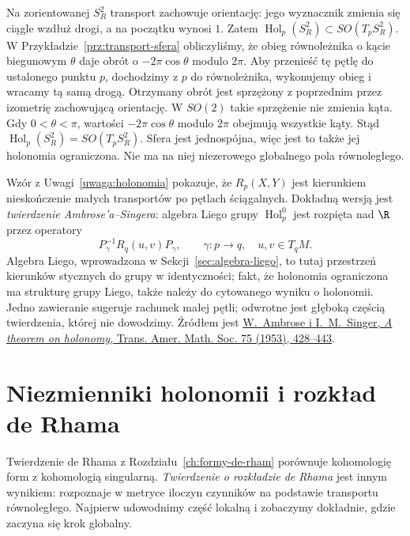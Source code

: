 \begin{przyklad}
\label{prz:holonomia-sfera}
Na zorientowanej $S_R^2$ transport zachowuje orientację:
jego wyznacznik zmienia się ciągle wzdłuż drogi,
a na początku wynosi $1$. Zatem
$\operatorname{Hol}_p(S_R^2)\subset SO(T_pS_R^2)$.
W Przykładzie~\ref{prz:transport-sfera} obliczyliśmy,
że obieg równoleżnika o kącie biegunowym $\theta$ daje obrót
o $-2\pi\cos\theta$ modulo $2\pi$. Aby przenieść tę
pętlę do ustalonego punktu $p$, dochodzimy z $p$ do
równoleżnika, wykonujemy obieg i wracamy tą samą drogą.
Otrzymany obrót jest sprzężony z poprzednim przez
izometrię zachowującą orientację. W $SO(2)$ takie
sprzężenie nie zmienia kąta. Gdy $0<\theta<\pi$,
wartości $-2\pi\cos\theta$ modulo $2\pi$ obejmują
wszystkie kąty. Stąd
$\operatorname{Hol}_p(S_R^2)=SO(T_pS_R^2)$.
Sfera jest jednospójna, więc jest to także jej
holonomia ograniczona. Nie ma na niej niezerowego
globalnego pola równoległego.
\end{przyklad}

\begin{uwaga}
\label{uwaga:ambrose-singer-holonomia}
Wzór z Uwagi~\ref{uwaga:holonomia} pokazuje, że
$R_p(X,Y)$ jest kierunkiem nieskończenie małych
transportów po pętlach ściągalnych. Dokładną wersją
jest \emph{twierdzenie Ambrose'a--Singera}:
algebra Liego grupy $\operatorname{Hol}^0_p$ jest
rozpięta nad $\R$ przez operatory
\[
 P_\gamma^{-1}R_q(u,v)P_\gamma,
 \qquad \gamma:p\longrightarrow q,\quad
 u,v\in T_qM.
\]
Algebra Liego, wprowadzona w Sekcji~\ref{sec:algebra-liego},
to tutaj przestrzeń kierunków stycznych do grupy
w identyczności; fakt, że holonomia ograniczona ma
strukturę grupy Liego, także należy do cytowanego
wyniku o holonomii. Jedno zawieranie sugeruje rachunek małej
pętli; odwrotne jest głęboką częścią twierdzenia, której
nie dowodzimy. Źródłem jest
\href{https://doi.org/10.1090/S0002-9947-1953-0063739-1}
{W.~Ambrose i I.~M.~Singer, \emph{A theorem on holonomy},
Trans. Amer. Math. Soc. 75 (1953), 428--443}.
\end{uwaga}

\section{Niezmienniki holonomii i rozkład de Rhama}
\label{sec:rozklad-de-rhama}

Twierdzenie de Rhama z Rozdziału~\ref{ch:formy-de-rham}
porównuje kohomologię form z kohomologią singularną.
\emph{Twierdzenie o rozkładzie de Rhama} jest innym
wynikiem: rozpoznaje w metryce iloczyn czynników na
podstawie transportu równoległego. Najpierw udowodnimy
część lokalną i zobaczymy dokładnie, gdzie zaczyna się
krok globalny.

